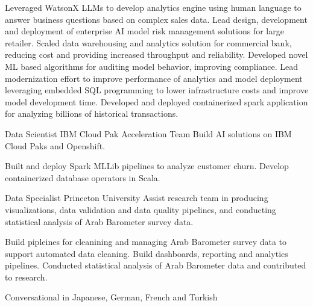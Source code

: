 \documentclass[a4paper]{Resume}
\begin{document}
\roleAchievements
{Leveraged WatsonX LLMs to develop analytics engine using human language to answer business questions based on complex sales data.}
{Lead design, development and deployment of enterprise AI model risk management solutions for large retailer.}
{Scaled data warehousing and analytics solution for commercial bank, reducing cost and providing increased throughput and reliability.}
{Developed novel ML based algorithms for auditing model behavior, improving compliance.}
{Lead modernization effort to improve performance of analytics and model deployment leveraging embedded SQL programming to lower infrastructure costs and improve model development time.}
{Developed and deployed containerized spark application for analyzing billions of historical transactions.}



{Data Scientist}
{IBM Cloud Pak Acceleration Team}
{Build AI solutions on IBM Cloud Paks and Openshift.}

{Built and deploy Spark MLLib pipelines to analyze customer churn.}
{Develop containerized database operators in Scala.}


{Data Specialist}
{Princeton University}
{Assist research team in producing visualizations, data validation and data quality pipelines, and conducting statistical analysis of Arab Barometer survey data.}

{Build pipleines for cleanining and managing Arab Barometer survey data to support automated data cleaning.}
{Build dashboards, reporting and analytics pipelines. Conducted statistical analysis of Arab Barometer data and contributed to research.}




         

		  {Conversational  in Japanese,}
		  {German,}
		  {French and}
		  {Turkish}
          
\clearpage
 
\end{document}
